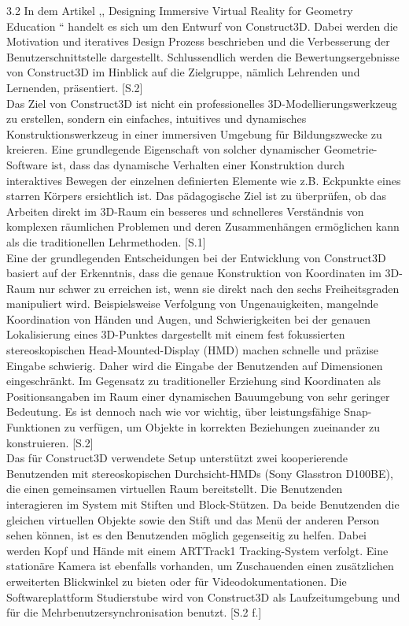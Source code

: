 \documentclass[deutsch]{llncs}
\begin{document}
3.2  In dem Artikel ,, Designing Immersive Virtual Reality for Geometry Education “ handelt es sich um den Entwurf von Construct3D. Dabei werden die Motivation und iteratives Design Prozess beschrieben und die Verbesserung der Benutzerschnittstelle dargestellt. Schlussendlich werden die Bewertungsergebnisse von Construct3D im Hinblick auf die Zielgruppe, nämlich Lehrenden und Lernenden, präsentiert. [S.2] \\
Das Ziel von Construct3D ist nicht ein professionelles 3D-Modellierungswerkzeug zu erstellen, sondern ein einfaches, intuitives und dynamisches Konstruktionswerkzeug in einer immersiven Umgebung für Bildungszwecke zu kreieren. Eine grundlegende Eigenschaft von solcher dynamischer Geometrie-Software ist, dass das dynamische Verhalten einer Konstruktion durch interaktives Bewegen der einzelnen definierten Elemente wie z.B. Eckpunkte eines starren Körpers ersichtlich ist. Das pädagogische Ziel ist zu überprüfen, ob das Arbeiten direkt im 3D-Raum ein besseres und schnelleres Verständnis von komplexen räumlichen Problemen und deren Zusammenhängen ermöglichen kann als die traditionellen Lehrmethoden. [S.1]\\
Eine der grundlegenden Entscheidungen bei der Entwicklung von Construct3D basiert auf der Erkenntnis, dass die genaue Konstruktion von Koordinaten im 3D-Raum nur schwer zu erreichen ist, wenn sie direkt nach den sechs Freiheitsgraden manipuliert wird. Beispielsweise Verfolgung von Ungenauigkeiten, mangelnde Koordination von Händen und Augen, und Schwierigkeiten bei der genauen Lokalisierung eines 3D-Punktes dargestellt mit einem fest fokussierten stereoskopischen Head-Mounted-Display (HMD) machen schnelle und präzise Eingabe schwierig. Daher wird die Eingabe der Benutzenden auf Dimensionen eingeschränkt. Im Gegensatz zu traditioneller Erziehung sind Koordinaten als Positionsangaben im Raum einer dynamischen Bauumgebung von sehr geringer Bedeutung. Es ist dennoch nach wie vor wichtig, über leistungsfähige Snap-Funktionen zu verfügen, um Objekte in korrekten Beziehungen zueinander zu konstruieren. [S.2]\\
Das für Construct3D verwendete Setup unterstützt zwei kooperierende Benutzenden mit stereoskopischen Durchsicht-HMDs (Sony Glasstron D100BE), die einen gemeinsamen virtuellen Raum bereitstellt. Die Benutzenden interagieren im System mit Stiften und Block-Stützen. Da beide Benutzenden die gleichen virtuellen Objekte sowie den Stift und das Menü der anderen Person sehen können, ist es den Benutzenden möglich gegenseitig zu helfen. Dabei werden Kopf und Hände mit einem ARTTrack1 Tracking-System verfolgt. Eine stationäre Kamera ist ebenfalls vorhanden, um Zuschauenden einen zusätzlichen erweiterten Blickwinkel zu bieten oder für Videodokumentationen. Die Softwareplattform Studierstube wird von Construct3D als Laufzeitumgebung und für die Mehrbenutzersynchronisation benutzt. [S.2 f.]\\
\end{document}
